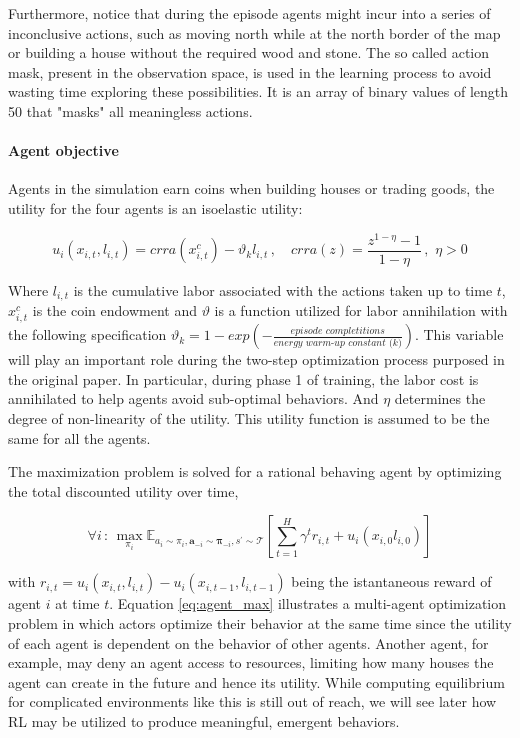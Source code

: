 Furthermore, notice that during the episode agents might incur into a series of inconclusive actions, such as moving north while at the north border of the map or building a house without the required wood and stone. The so called action mask,  present in the observation space, is used in the learning process to avoid wasting time exploring these possibilities. It is an array of binary values of length 50 that "masks" all meaningless actions.

\paragraph{Agent objective}

Agents in the simulation earn coins when building houses or trading goods, the utility for the four agents is an isoelastic utility:

\begin{equation}
u_i(x_{i,t}, l_{i,t}) = crra(x_{i,t}^c) - \vartheta_k l_{i,t}\,, \quad crra(z) = \frac{z^{1- \eta}-1}{1-\eta}\,,\,\, \eta > 0
\end{equation}

Where \( l_{i,t} \) is the cumulative labor associated with the actions taken up to time \( t \), \( x_{i,t}^c \) is the coin endowment and \( \vartheta \) is a function utilized for labor annihilation with the following specification \( \vartheta_k = 1- exp\left(- \frac{\textit{episode completitions}}{\textit{energy warm-up constant (k)}}\right)\). This variable will play an important role during the two-step optimization process purposed in the original paper. In particular, during phase 1 of training, the labor cost is annihilated to help agents avoid sub-optimal behaviors. And \( \eta \) determines the degree of non-linearity of the utility. This utility function is assumed to be the same for all the agents.

The maximization problem is solved for a rational behaving agent by optimizing the total discounted utility over time,


\begin{equation}
\forall i \,:\, \max_{\pi_i}\mathbb{E}_{a_i \sim \pi_i, \boldsymbol{a}_{-i} \sim \boldsymbol{\pi}_{-i}, s^{'}\sim\mathcal{T}}\left[ \sum_{t=1}^H \gamma^t r_{i,t} + u_i({x_{i,0}l_{i,0}})\right]
\label{eq:agent_max}
\end{equation}


with \( r_{i,t} = u_i(x_{i,t},l_{i,t})  - u_i(x_{i,t-1},l_{i,t-1}) \) being the istantaneous reward of agent \( i \) at time \( t \). Equation \ref{eq:agent_max} illustrates a multi-agent optimization problem in which actors optimize their behavior at the same time since the utility of each agent is dependent on the behavior of other agents. Another agent, for example, may deny an agent access to resources, limiting how many houses the agent can create in the future and hence its utility. While computing equilibrium for complicated environments like this is still out of reach, we will see later how RL may be utilized to produce meaningful, emergent behaviors.


